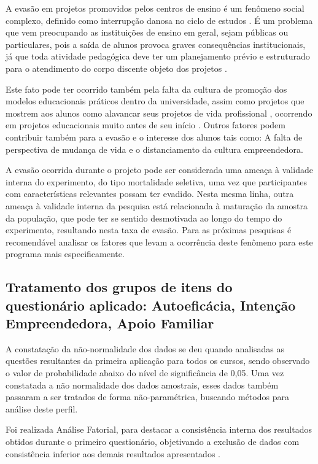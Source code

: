 A evasão em projetos promovidos pelos centros de ensino é um fenômeno social complexo, definido como interrupção danosa no ciclo de estudos \cite{santos_baggi_dropout_2011}. É um problema que vem preocupando as instituições de ensino em geral, sejam públicas ou particulares, pois a saída de alunos provoca graves consequências institucionais, já que toda atividade pedagógica deve ter um planejamento prévio e estruturado para o atendimento do corpo discente objeto dos projetos \cite{figueiredo_educacao_2017}. 

Este fato pode ter ocorrido também pela falta da cultura de promoção dos modelos educacionais práticos dentro da universidade, assim como projetos que mostrem aos alunos como alavancar seus projetos de vida profissional \cite{nobre_amostragem_2016}, ocorrendo em projetos educacionais muito antes de seu início . Outros fatores podem contribuir também para a evasão e o interesse dos alunos tais como: A falta de perspectiva de mudança de vida e o distanciamento da cultura empreendedora.

A evasão ocorrida durante o projeto pode ser considerada uma ameaça à validade interna do experimento, do tipo mortalidade seletiva, uma vez que participantes com características relevantes possam ter evadido. Nesta mesma linha, outra ameaça à validade interna da pesquisa está relacionada à maturação da amostra da população, que pode ter se sentido desmotivada ao longo do tempo do experimento, resultando nesta taxa de evasão. Para as próximas pesquisas é recomendável analisar os fatores que levam a ocorrência deste fenômeno para este programa mais especificamente. 

\subsection{Tratamento dos grupos de itens do questionário aplicado: Autoeficácia, Intenção Empreendedora, Apoio Familiar}

A constatação da não-normalidade dos dados se deu quando analisadas as questões resultantes da primeira aplicação para todos os cursos, sendo observado o valor de probabilidade abaixo do nível de significância de 0,05. Uma vez constatada a não normalidade dos dados amostrais, esses dados também passaram a ser tratados de forma não-paramétrica, buscando métodos para análise deste perfil.

Foi realizada Análise Fatorial, para destacar a consistência interna dos resultados obtidos durante o primeiro questionário, objetivando a exclusão de dados com consistência inferior aos demais resultados apresentados .

